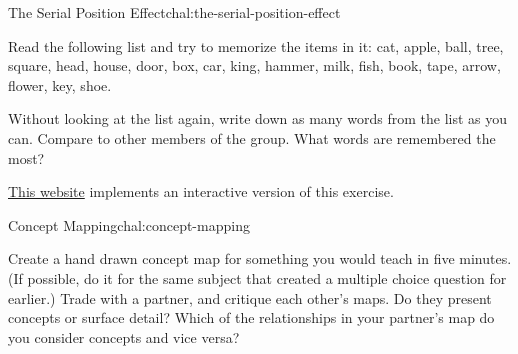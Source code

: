 
\begin{challenge}{The Serial Position Effect}{chal:the-serial-position-effect}

Read the following list and try to memorize the items in it: cat,
apple, ball, tree, square, head, house, door, box, car, king, hammer,
milk, fish, book, tape, arrow, flower, key, shoe.

Without looking at the list again, write down as many words from the
list as you can. Compare to other members of the group. What words are
remembered the most?

\href{http://cat.xula.edu/thinker/memory/working/serial}{This website}
implements an interactive version of this exercise.

\end{challenge}

\begin{challenge}{Concept Mapping}{chal:concept-mapping}

Create a hand drawn concept map for something you would teach in five
minutes.  (If possible, do it for the same subject that created a
multiple choice question for earlier.) Trade with a partner, and
critique each other's maps. Do they present concepts or surface
detail? Which of the relationships in your partner's map do you
consider concepts and vice versa?

\end{challenge}


